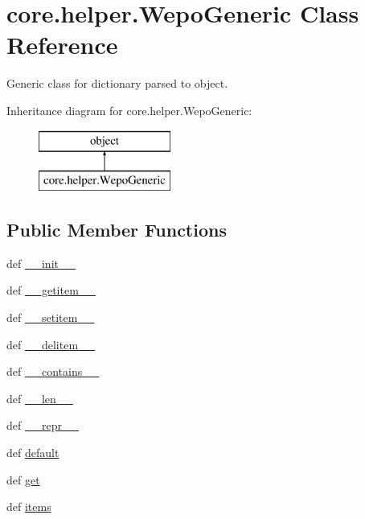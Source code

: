 \hypertarget{classcore_1_1helper_1_1WepoGeneric}{\section{core.\-helper.\-Wepo\-Generic Class Reference}
\label{classcore_1_1helper_1_1WepoGeneric}
}


Generic class for dictionary parsed to object.  


Inheritance diagram for core.\-helper.\-Wepo\-Generic\-:\begin{figure}[H]
\begin{center}
\leavevmode
\includegraphics[height=2.000000cm]{classcore_1_1helper_1_1WepoGeneric}
\end{center}
\end{figure}
\subsection*{Public Member Functions}
\begin{DoxyCompactItemize}
\item 
def \hyperlink{classcore_1_1helper_1_1WepoGeneric_a83ef1df0334c5cc72ea89fa029cc37c4}{\-\_\-\-\_\-init\-\_\-\-\_\-}
\item 
def \hyperlink{classcore_1_1helper_1_1WepoGeneric_a2072481aaf051287e56ed4dfd87ffec7}{\-\_\-\-\_\-getitem\-\_\-\-\_\-}
\item 
def \hyperlink{classcore_1_1helper_1_1WepoGeneric_abfdf3390194b505fd0c05361b3c83564}{\-\_\-\-\_\-setitem\-\_\-\-\_\-}
\item 
def \hyperlink{classcore_1_1helper_1_1WepoGeneric_af1d485ced44f07dc3998efdbe2dce657}{\-\_\-\-\_\-delitem\-\_\-\-\_\-}
\item 
def \hyperlink{classcore_1_1helper_1_1WepoGeneric_a6ac9090db2617973fdd72e70cddf47e0}{\-\_\-\-\_\-contains\-\_\-\-\_\-}
\item 
def \hyperlink{classcore_1_1helper_1_1WepoGeneric_ab2a4b8ebc9e566c288ccdbc3f4091c0f}{\-\_\-\-\_\-len\-\_\-\-\_\-}
\item 
def \hyperlink{classcore_1_1helper_1_1WepoGeneric_a9899aa93968cea184da6e68e7008f0f5}{\-\_\-\-\_\-repr\-\_\-\-\_\-}
\item 
def \hyperlink{classcore_1_1helper_1_1WepoGeneric_a3f655e187e647683b5209ac4df0341de}{default}
\item 
def \hyperlink{classcore_1_1helper_1_1WepoGeneric_a88d3712b75a9e33a30488686ac4a5737}{get}
\item 
def \hyperlink{classcore_1_1helper_1_1WepoGeneric_ac639a89dd3376ad018d3063d53e256e5}{items}
\end{DoxyCompactItemize}


